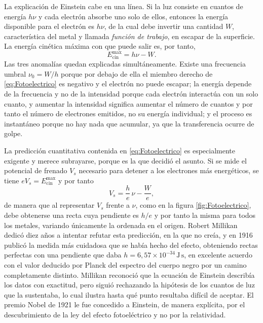             La explicación de Einstein cabe en una línea. Si la luz consiste en cuantos de energía $h\nu$ y cada electrón absorbe uno solo de ellos, entonces la energía disponible para el electrón es $h\nu$, de la cual debe invertir una cantidad $W$, característica del metal y llamada \textit{función de trabajo}, en escapar de la superficie. La energía cinética máxima con que puede salir es, por tanto,
            \begin{equation}\label{eq:Fotoelectrico}
                \boxed{\;E_{\text{cin}}^{\max} = h\nu - W .\;}
            \end{equation}
            Las tres anomalías quedan explicadas simultáneamente. Existe una frecuencia umbral $\nu_{0} = W/h$ porque por debajo de ella el miembro derecho de \eqref{eq:Fotoelectrico} es negativo y el electrón no puede escapar; la energía depende de la frecuencia y no de la intensidad porque cada electrón interactúa con un solo cuanto, y aumentar la intensidad significa aumentar el número de cuantos y por tanto el número de electrones emitidos, no su energía individual; y el proceso es instantáneo porque no hay nada que acumular, ya que la transferencia ocurre de golpe.

            La predicción cuantitativa contenida en \eqref{eq:Fotoelectrico} es especialmente exigente y merece subrayarse, porque es la que decidió el asunto. Si se mide el potencial de frenado $V_{s}$ necesario para detener a los electrones más energéticos, se tiene $eV_{s} = E_{\text{cin}}^{\max}$ y por tanto
            \begin{equation}\label{eq:PotencialFrenado}
                V_{s} = \frac{h}{e}\,\nu - \frac{W}{e},
            \end{equation}
            de manera que al representar $V_{s}$ frente a $\nu$, como en la figura \ref{fig:Fotoelectrico}, debe obtenerse una recta cuya pendiente es $h/e$ y por tanto la misma para todos los metales, variando únicamente la ordenada en el origen. Robert Millikan dedicó diez años a intentar refutar esta predicción, en la que no creía, y en 1916 publicó la medida más cuidadosa que se había hecho del efecto, obteniendo rectas perfectas con una pendiente que daba $h = 6{,}57\times 10^{-34}\,\mathrm{J\,s}$, en excelente acuerdo con el valor deducido por Planck del espectro del cuerpo negro por un camino completamente distinto. Millikan reconoció que la ecuación de Einstein describía los datos con exactitud, pero siguió rechazando la hipótesis de los cuantos de luz que la sustentaba, lo cual ilustra hasta qué punto resultaba difícil de aceptar. El premio Nobel de 1921 le fue concedido a Einstein, de manera explícita, por el descubrimiento de la ley del efecto fotoeléctrico y no por la relatividad.

